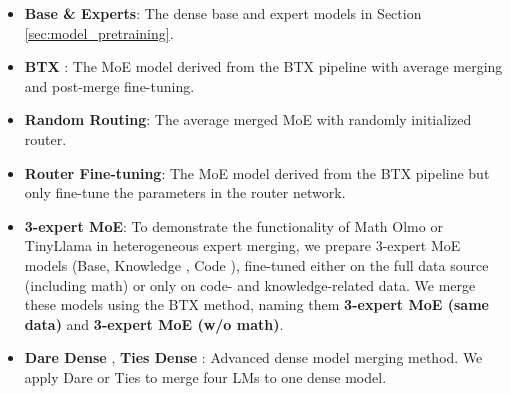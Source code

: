 \begin{itemize}[leftmargin=*]
    \item \textbf{Base \& Experts}: The dense base and expert models in Section \ref{sec:model_pretraining}.
    
    
    
    \item \textbf{BTX} \cite{sukhbaatar2024branchtrainmixmixingexpertllms}: The MoE model derived from the BTX pipeline with average merging and post-merge fine-tuning.
    \item \textbf{Random Routing}: The average merged MoE with randomly initialized router.
    \item \textbf{Router Fine-tuning}: The MoE model derived from the BTX pipeline but only fine-tune the parameters in the router network.
    \item \textbf{3-expert MoE}: 
    To demonstrate the functionality of Math Olmo or TinyLlama in heterogeneous expert merging, we prepare 3-expert MoE models (Base, Knowledge \llama, Code \llama), fine-tuned either on the full data source (including math) or only on code- and knowledge-related data. We merge these models using the BTX method, naming them \textbf{3-expert MoE (same data)} and \textbf{3-expert MoE (w/o math)}.
    \item  \textbf{Dare Dense} \cite{yu2024language}, \textbf{Ties Dense} \cite{yadav2024ties}: Advanced dense model merging method. We apply Dare or Ties to merge four LMs to one dense model.
\end{itemize}


